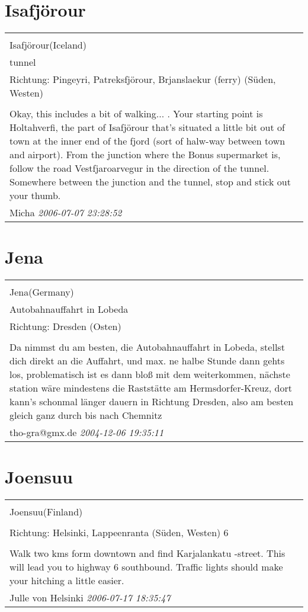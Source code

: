 \documentclass[a4paper,12pt]{article}
\begin{document}
\section{Isafjörour}
\begin{tabular}{|p{13cm}|}
\hline\\
Isafjörour(Iceland)\\
tunnel\\
Richtung: Pingeyri, Patreksfjörour, Brjanslaekur (ferry) (Süden, Westen) \\
\hline\\
Okay, this includes a bit of walking... . Your starting point is Holtahverfi, the part of Isafjörour that's situated a little bit out of town at the inner end of the fjord (sort of halw-way between town and airport). From the junction where the Bonus supermarket is, follow the road Vestfjaroarvegur in the direction of the tunnel. Somewhere between the junction and the tunnel, stop and stick out your thumb. \\
Micha \textit{ 2006-07-07 23:28:52 }\\\hline
\end{tabular}


\section{Jena}
\begin{tabular}{|p{13cm}|}
\hline\\
Jena(Germany)\\
Autobahnauffahrt in Lobeda\\
Richtung: Dresden (Osten) \\
\hline\\
Da nimmst du am besten, die Autobahnauffahrt in Lobeda, stellst dich direkt an die Auffahrt, und max. ne halbe Stunde dann gehts los, problematisch ist es dann bloß mit dem weiterkommen, nächste station wäre mindestens die Raststätte am Hermsdorfer-Kreuz, dort kann's schonmal länger dauern in Richtung Dresden, also am besten gleich ganz durch bis nach Chemnitz \\
tho-gra@gmx.de \textit{ 2004-12-06 19:35:11 }\\\hline
\end{tabular}


\section{Joensuu}
\begin{tabular}{|p{13cm}|}
\hline\\
Joensuu(Finland)\\
\\
Richtung: Helsinki, Lappeenranta (Süden, Westen) 6 \\
\hline\\
Walk two kms form downtown and find Karjalankatu -street. This will lead you to highway 6 southbound. Traffic lights should make your hitching a little easier. \\
Julle von Helsinki \textit{ 2006-07-17 18:35:47 }\\\hline
\end{tabular}
\end{document}
